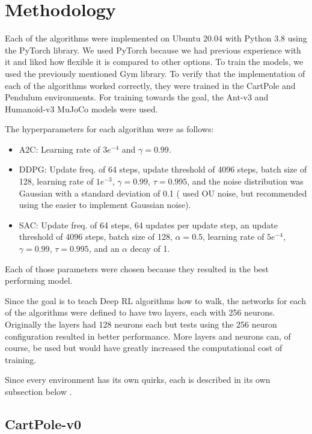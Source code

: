 \documentclass[conference]{IEEEtran}
\begin{document}
\section{Methodology}

Each of the algorithms were implemented on Ubuntu 20.04 with Python 3.8 using the PyTorch library. We used PyTorch because we had previous experience with it and liked how flexible it is compared to other options. To train the models, we used the previously mentioned Gym library. To verify that the implementation of each of the algorithms worked correctly, they were trained in the CartPole and Pendulum environments. For training towards the goal, the Ant-v3 and Humanoid-v3 MuJoCo models were used.

The hyperparameters for each algorithm were as follows:
\begin{itemize}
    \item A2C: Learning rate of $3e^{-4}$ and $\gamma = 0.99$.
    \item DDPG: Update freq. of 64 steps, update threshold of 4096 steps, batch size of 128, learning rate of $1e^{-3}$, $\gamma = 0.99$, $\tau = 0.995$, and the noise distribution was Gaussian with a standard deviation of 0.1 (\cite{DDPG} used OU noise, but \cite{spinning_up_ddpg} recommended using the easier to implement Gaussian noise).
    \item SAC: Update freq. of 64 steps, 64 updates per update step, an update threshold of 4096 steps, batch size of 128, $\alpha = 0.5$, learning rate of $5e^{-4}$, $\gamma = 0.99$, $\tau = 0.995$, and an $\alpha$ decay of 1.
\end{itemize}
Each of those parameters were chosen because they resulted in the best performing model.

Since the goal is to teach Deep RL algorithms how to walk, the networks for each of the algorithms were defined to have two layers, each with 256 neurons. Originally the layers had 128 neurons each but tests using the 256 neuron configuration resulted in better performance. More layers and neurons can, of course, be used but would have greatly increased the computational cost of training.

Since every environment has its own quirks, each is described in its own subsection below \cite {gym_source}.

\subsection{CartPole-v0}
\end{document}
